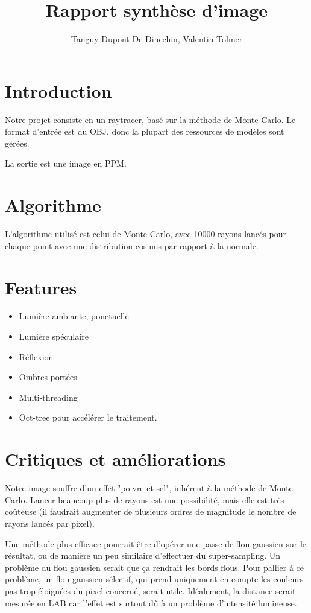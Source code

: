 \documentclass{article}
\title{Rapport synthèse d'image}
\author{Tanguy Dupont De Dinechin, Valentin Tolmer}
\begin{document}
\maketitle

\section{Introduction}

Notre projet consiste en un raytracer, basé sur la méthode de Monte-Carlo. Le
format d'entrée est du OBJ, donc la plupart des ressources de modèles sont
gérées.

La sortie est une image en PPM.

\section{Algorithme}

L'algorithme utilisé est celui de Monte-Carlo, avec 10000 rayons lancés pour
chaque point avec une distribution cosinus par rapport à la normale.

\section{Features}

\begin{itemize}
  \item Lumière ambiante, ponctuelle
  \item Lumière spéculaire
  \item Réflexion
  \item Ombres portées
  \item Multi-threading
  \item Oct-tree pour accélérer le traitement.
\end{itemize}

\section{Critiques et améliorations}

Notre image souffre d'un effet "poivre et sel", inhérent à la méthode de
Monte-Carlo. Lancer beaucoup plus de rayons est une possibilité, mais elle est
très coûteuse (il faudrait augmenter de plusieurs ordres de magnitude le nombre
de rayons lancés par pixel).

Une méthode plus efficace pourrait être d'opérer
une passe de flou gaussien sur le résultat, ou de manière un peu similaire
d'effectuer du super-sampling. Un problème du flou gaussien serait que ça
rendrait les bords flous. Pour pallier à ce problème, un flou gaussien
sélectif, qui prend uniquement en compte les couleurs pas trop éloignées du
pixel concerné, serait utile. Idéalement, la distance serait mesurée en LAB car
l'effet est surtout dû à un problème d'intensité lumineuse.
\end{document}
